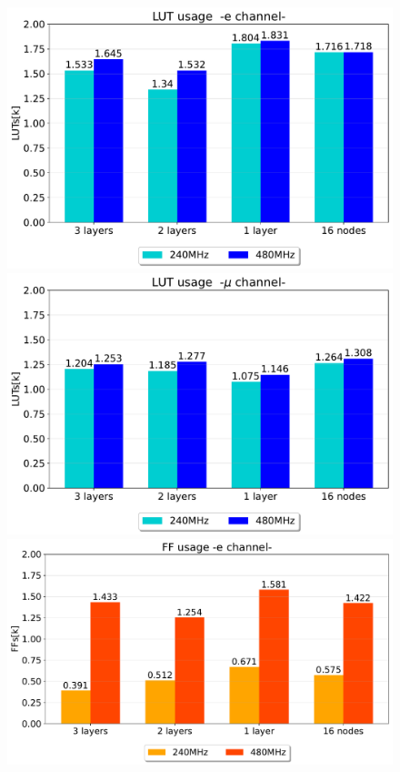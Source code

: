\documentclass[../../main.tex]{subfiles}
\begin{document}
\clearpage
\begin{figure}[!ht] 
  \label{ fig7} 
  \begin{minipage}[b]{0.5\linewidth}
    \centering
    \includegraphics[width=.82\linewidth]{sections/05/Images/LUT_usage_1ele_@480.pdf}  
    \vspace{4ex}
  \end{minipage}%
  \begin{minipage}[b]{0.5\linewidth}
    \centering
    \includegraphics[width=.82\linewidth]{sections/05/Images/LUT_usage_1mu_@480.pdf}
    \vspace{4ex}
  \end{minipage} 
  \begin{minipage}[b]{0.5\linewidth}
    \centering
    \includegraphics[width=.82\linewidth]{sections/05/Images/FF_usage1ele_@480.pdf} 

\end{minipage}
\end{figure}
\end{document}
